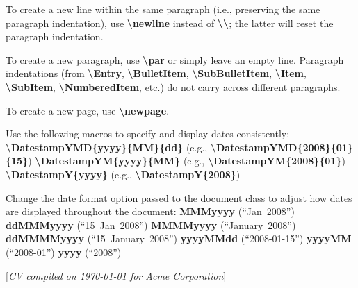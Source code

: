 \documentclass[letterpaper,MMMyyyy,nonstopmode]{./simple-resume-cv-master/simpleresumecv}
\newcommand{\CVNote}{CV compiled on {\today} for Acme Corporation}
\newcommand{\Code}[1]{\mbox{\textbf{#1}}}
\newcommand{\CodeCommand}[1]{\mbox{\textbf{\textbackslash{#1}}}}
\begin{document}
\begin{Body}
	\Gap
	\BulletItem
	To create a new line within the same paragraph (i.e., preserving the same paragraph indentation), use \CodeCommand{newline} instead of \CodeCommand{\textbackslash};
	the latter will reset the paragraph indentation.

	\Gap
	\BulletItem
		To create a new paragraph, use \CodeCommand{par} or simply leave an empty line.
		Paragraph indentations (from
		\CodeCommand{Entry},
		\CodeCommand{BulletItem},
		\CodeCommand{SubBulletItem},
		\CodeCommand{Item},
		\CodeCommand{SubItem},
		\CodeCommand{NumberedItem},
		etc.) do not carry across different paragraphs.

	\Gap
	\BulletItem
		To create a new page, use \CodeCommand{newpage}.

	\BigGap

	\Gap
	\BulletItem
		Use the following macros to specify and display dates consistently:
		\SubBulletItem
		\CodeCommand{DatestampYMD\{yyyy\}\{MM\}\{dd\}}
		(e.g., \CodeCommand{DatestampYMD\{2008\}\{01\}\{15\}})
		\SubBulletItem
		\CodeCommand{DatestampYM\{yyyy\}\{MM\}}
		(e.g., \CodeCommand{DatestampYM\{2008\}\{01\}})
		\SubBulletItem
		\CodeCommand{DatestampY\{yyyy\}}
		(e.g., \CodeCommand{DatestampY\{2008\}})

	\Gap
	\BulletItem
		Change the date format option passed to the document class to adjust how dates are displayed throughout the document:
		\SubBulletItem
			\Code{MMMyyyy} (``Jan~2008'')
		\SubBulletItem
			\Code{ddMMMyyyy} (``15~Jan~2008'')
		\SubBulletItem
			\Code{MMMMyyyy} (``January~2008'')
		\SubBulletItem
			\Code{ddMMMMyyyy} (``15~January~2008'')
		\SubBulletItem
			\Code{yyyyMMdd} (``2008-01-15'')
		\SubBulletItem
			\Code{yyyyMM} (``2008-01'')
		\SubBulletItem
			\Code{yyyy} (``2008'')
\endgroup
\end{Body}

\UseNoteFont%
\null\hfill%
[\textit{\CVNote}]
\end{document}
